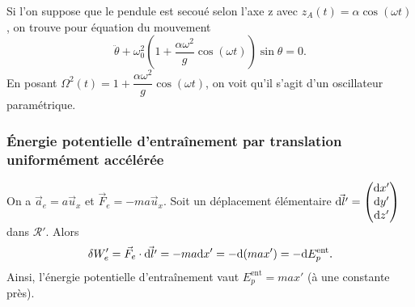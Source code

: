             Si l'on suppose que le pendule est secoué selon l'axe z avec $z_{A}(t)=\alpha\cos(\omega t)$, on trouve pour équation du mouvement
            \begin{equation*}
                \ddot{\theta}+\omega_{0}^{2}\left(1+\frac{\alpha\omega^{2}}{g}\cos(\omega t)\right)\sin\theta = 0.
            \end{equation*}
            En posant $\Omega^{2}(t)=1+\dfrac{\alpha\omega^{2}}{g}\cos(\omega t)$, on voit qu'il s'agit d'un oscillateur paramétrique.

        \subsubsection{Énergie potentielle d'entraînement par translation uniformément accélérée}
            
            On a $\vec{a}_e=a\vec{u}_x$ et $\vec{F}_e=-ma\vec{u}_x$. Soit un déplacement élémentaire $\vec{\mathrm{d} l'}=\begin{pmatrix}\mathrm{d} x'\\\mathrm{d} y'\\\mathrm{d} z'\end{pmatrix} $ dans $\mathcal{R}'$. Alors 
            \begin{equation*}
                \delta W_e'=\vec{F}_e\cdot\vec{\mathrm{d} l'}=-ma\mathrm{d} x'=-\mathrm{d}(max')=-\mathrm{d} E_p^{\text{ent}}.
            \end{equation*}
            Ainsi, l'énergie potentielle d'entraînement vaut $E_{p}^{\text{ent}}=max'$ (à une constante près).

